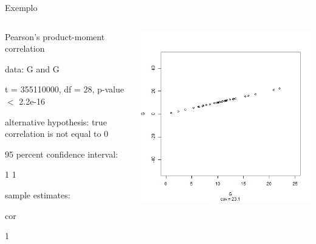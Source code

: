 \documentclass{beamer}
\begin{document}
\begin{frame}{Exemplo}
  \begin{columns}
    \begin{column}{5cm}
      \begin{block}{}
              \tiny
      	Pearson's product-moment correlation

        data:  G and G
        
        t = 355110000, df = 28, p-value $<$ 2.2e-16
        
        alternative hypothesis: true correlation is not equal to 0
        
        95 percent confidence interval:
        
        1 1
        
        sample estimates:
        
        cor

        1 
      \end{block}
   \end{column}
    \begin{column}{5cm}
      \begin{center}
        \includegraphics[height=.8\textheight]{Cap17/anim-0}
      \end{center}
    \end{column}
\end{columns}
\end{frame}
\end{document}
